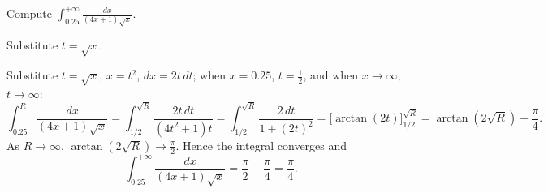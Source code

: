 
\begin{question}
Compute $\displaystyle\int_{0.25}^{+\infty}\frac{dx}{(4x+1)\sqrt x}$.
\end{question}

\begin{hint}
Substitute $t=\sqrt x$.
\end{hint}

\begin{solution}
Substitute $t=\sqrt x$, $x=t^2$, $dx=2t\,dt$; when $x=0.25$, $t=\frac12$, and when $x\to\infty$, $t\to\infty$:
\[ \int_{0.25}^{R}\frac{dx}{(4x+1)\sqrt x}=\int_{1/2}^{\sqrt R}\frac{2t\,dt}{(4t^2+1)t}=\int_{1/2}^{\sqrt R}\frac{2\,dt}{1+(2t)^2}=\Big[\arctan(2t)\Big]_{1/2}^{\sqrt R}=\arctan(2\sqrt R)-\frac\pi4. \]
As $R\to\infty$, $\arctan(2\sqrt R)\to\frac\pi2$. Hence the integral converges and
\[ \int_{0.25}^{+\infty}\frac{dx}{(4x+1)\sqrt x}=\frac\pi2-\frac\pi4=\frac\pi4. \]
\end{solution}
